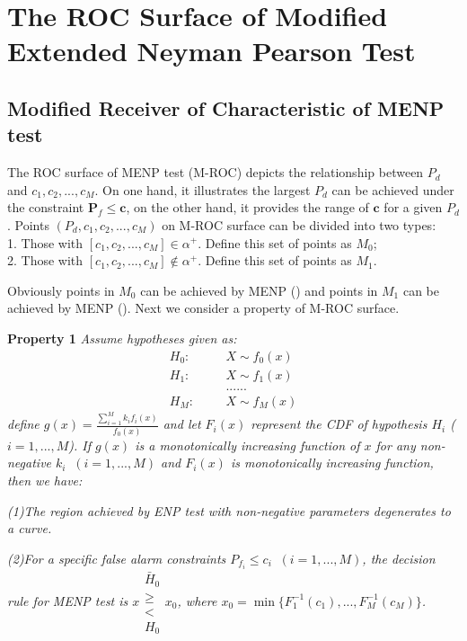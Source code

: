 \section{The ROC Surface of Modified Extended Neyman Pearson Test}

\subsection{Modified Receiver of Characteristic of MENP test}

The ROC surface of MENP test (M-ROC) depicts the relationship between $P_d$ and $c_1, c_2, ..., c_M$. On one hand, it  illustrates the largest $P_d$ can be achieved under the constraint $\mathbf{P}_{f} \leq \mathbf{c}$, on the other hand, it provides the range of $\mathbf{c}$ for a given $P_d$.
Points $(P_d, c_1, c_2, ..., c_M)$ on M-ROC  surface can be divided into two types: 
\\1. Those with $[c_1, c_2, ..., c_M] \in \alpha^+$. Define this set of points as $M_0$; 
\\2. Those with $[c_1, c_2, ..., c_M] \notin \alpha^+$. Define this set of points as $M_1$. 

Obviously points in $M_0$ can be achieved by MENP () and points in $M_1$ can  be achieved by MENP (). Next we consider a property of M-ROC surface.

\noindent \textbf{Property 1}
\noindent \textit{
  \noindent Assume hypotheses given as:
}
\begin{equation}
  \begin{split}
	H_0:\;\;\;\;\;\;&X \sim f_0(x)\\
	H_1:\;\;\;\;\;\;&X \sim f_1(x)\\
	&......\\
	H_M:\;\;\;\;\;\;&X \sim f_M(x)
  \end{split}
\end{equation}
\textit{
  define $g(x) = \frac{\sum_{i=1}^{M}k_if_i(x)}{f_0(x)}$ and let $F_i(x)$ represent the CDF of hypothesis $H_i$ ($i = 1, ..., M$). If $g(x)$ is a monotonically increasing function of $x$ for any non-negative $k_i\;\;(i = 1, ..., M)$ and $F_i(x)$ is monotonically increasing function, then we have:}

  \textit{(1)The region achieved by ENP test with non-negative parameters degenerates to a curve.}

  \textit{(2)For a specific false alarm constraints $P_{f_i} \leq c_i\;\;(i = 1, ..., M)$, the decision rule for MENP test is $x \substack{\bar{H}_0 \\ \geq \\ < \\H_0} x_0$, where $x_0 = \min\{F_1^{-1}(c_1), ..., F_M^{-1}(c_M)\}$.}

